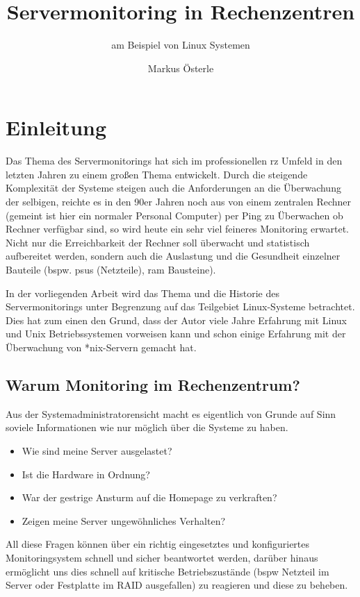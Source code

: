 \documentclass[12pt,a4paper,parskip]{scrreprt}
\begin{document}
	\subject{Seminararbeit im Studiengang \glqq Verwaltungsinformatik\grqq}
	\author{Markus Österle}
	\title{Servermonitoring in Rechenzentren}
	\subtitle{am Beispiel von Linux Systemen}
	\publishers{Betreut von Dipl. Inf. Stefan Müller}
	\date{} %

	\maketitle
	
	\tableofcontents
	\onehalfspacing
	\chapter{Einleitung}
	Das Thema des Servermonitorings hat sich im professionellen \acrshort{rz} Umfeld in den letzten Jahren zu einem großen Thema entwickelt. Durch die steigende Komplexität der Systeme steigen auch die Anforderungen an die Überwachung der selbigen, reichte es in den 90er Jahren noch aus von einem zentralen Rechner (gemeint ist hier ein normaler Personal Computer) per Ping zu Überwachen ob Rechner verfügbar sind, so wird heute ein sehr viel feineres Monitoring erwartet. Nicht nur die Erreichbarkeit der Rechner soll überwacht und statistisch aufbereitet werden, sondern auch die Auslastung und die Gesundheit einzelner Bauteile (bspw. \acrlong{psu}s (Netzteile), \acrshort{ram} Bausteine). 

	In der vorliegenden Arbeit wird das Thema und die Historie des Servermonitorings unter Begrenzung auf das Teilgebiet Linux-Systeme betrachtet. Dies hat zum einen den Grund, dass der Autor viele Jahre Erfahrung mit Linux und Unix Betriebssystemen vorweisen kann und schon einige Erfahrung mit der Überwachung von *nix-Servern gemacht hat.
	\section{Warum Monitoring im Rechenzentrum?}
	Aus der Systemadministratorensicht macht es eigentlich von Grunde auf Sinn soviele Informationen wie nur möglich über die Systeme zu haben. 
	\begin{itemize}
		\item Wie sind meine Server ausgelastet?
		\item Ist die Hardware in Ordnung?
		\item War der gestrige Ansturm auf die Homepage zu verkraften?
		\item Zeigen meine Server ungewöhnliches Verhalten? 
	\end{itemize}
	  All diese Fragen können über ein richtig eingesetztes und konfiguriertes Monitoringsystem schnell und sicher beantwortet werden, darüber hinaus ermöglicht uns dies schnell auf kritische Betriebszustände (\acrlong{bspw} Netzteil im Server oder Festplatte im RAID ausgefallen) zu reagieren und diese zu beheben. 
	  
\end{document}
